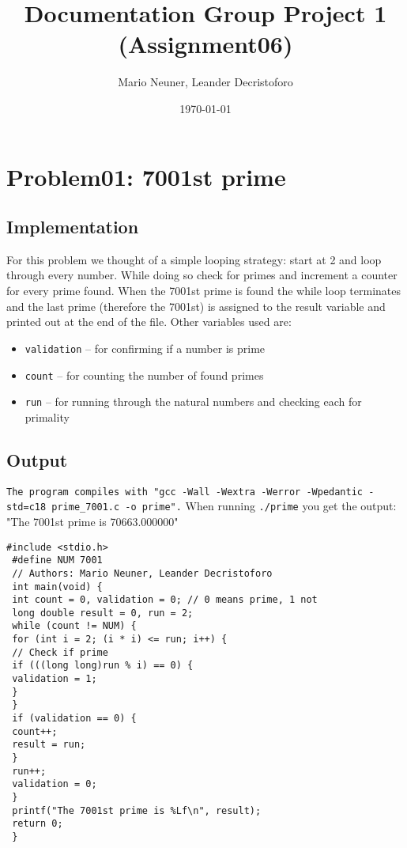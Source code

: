 \documentclass[12pt,a4paper]{article}
\title{Documentation Group Project 1 (Assignment06)}
\author{Mario Neuner, Leander Decristoforo}
\date{\today}
\begin{document}
\maketitle
\tableofcontents
\pagebreak

\section{Problem01: 7001st prime}
\vspace{0pt}
\subsection{Implementation}
For this problem we thought of a simple looping strategy: start at 2 and loop through every number. While doing so check for
primes and increment a counter for every prime found. When the 7001st prime is found the while loop terminates and the last prime
(therefore the 7001st) is assigned to the result variable and printed out at the end of the file. Other variables used are:
\begin{itemize}
\item \texttt{validation} -- for confirming if a number is prime
\item \texttt{count} -- for counting the number of found primes
\item \texttt{run} -- for running through the natural numbers and checking each for primality
\end{itemize}
\subsection{Output}
\texttt{The program compiles with "gcc -Wall -Wextra -Werror -Wpedantic -std=c18 prime\_7001.c -o prime".}
When running \texttt{./prime} you get the output: 
\newline
"The 7001st prime is 70663.000000"

\begin{lstlisting}[caption={7001st prime in C},label={lst:p7001}]
 #include <stdio.h>
 #define NUM 7001
 // Authors: Mario Neuner, Leander Decristoforo
 int main(void) {
 int count = 0, validation = 0; // 0 means prime, 1 not
 long double result = 0, run = 2;
 while (count != NUM) {
 for (int i = 2; (i * i) <= run; i++) {
 // Check if prime
 if (((long long)run % i) == 0) {
 validation = 1;
 }
 }
 if (validation == 0) {
 count++;
 result = run;
 }
 run++;
 validation = 0;
 }
 printf("The 7001st prime is %Lf\n", result);
 return 0;
 }
\end{lstlisting}
\end{document}
